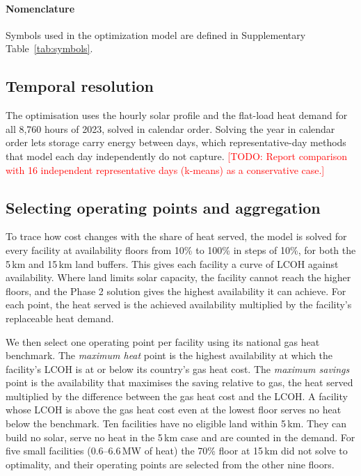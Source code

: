 \documentclass[11pt]{article}
\newcommand{\todo}[1]{\textcolor{red}{[TODO: #1]}}
\begin{document}
\paragraph*{Nomenclature}
Symbols used in the optimization model are defined in Supplementary Table~\ref{tab:symbols}.



\subsection*{Temporal resolution}
The optimisation uses the hourly solar profile and the flat-load heat demand for all 8,760 hours of 2023, solved in calendar order. Solving the year in calendar order lets storage carry energy between days, which representative-day methods that model each day independently do not capture\cite{kotzur2018}.
\todo{Report comparison with 16 independent representative days (k-means) as a conservative case.}

\subsection*{Selecting operating points and aggregation}
To trace how cost changes with the share of heat served, the model is solved for every facility at availability floors from 10\% to 100\% in steps of 10\%, for both the 5\,km and 15\,km land buffers. This gives each facility a curve of LCOH against availability. Where land limits solar capacity, the facility cannot reach the higher floors, and the Phase 2 solution gives the highest availability it can achieve. For each point, the heat served is the achieved availability multiplied by the facility's replaceable heat demand.

We then select one operating point per facility using its national gas heat benchmark. The \emph{maximum heat} point is the highest availability at which the facility's LCOH is at or below its country's gas heat cost. The \emph{maximum savings} point is the availability that maximises the saving relative to gas, the heat served multiplied by the difference between the gas heat cost and the LCOH. A facility whose LCOH is above the gas heat cost even at the lowest floor serves no heat below the benchmark. Ten facilities have no eligible land within 5\,km. They can build no solar, serve no heat in the 5\,km case and are counted in the demand. For five small facilities (0.6--6.6\,MW of heat) the 70\% floor at 15\,km did not solve to optimality, and their operating points are selected from the other nine floors.
\end{document}
